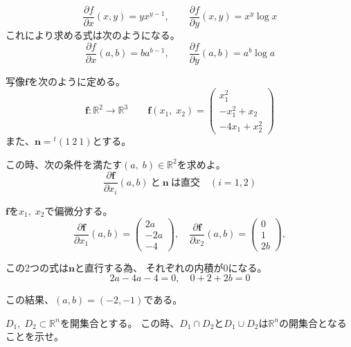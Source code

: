 \documentclass[12pt,b5paper]{ltjsarticle}
\begin{document}
\begin{equation}
 \frac{\partial f}{\partial x}(x,y) = yx^{y-1},
  \qquad
  \frac{\partial f}{\partial y}(x,y) = x^y \log x
\end{equation}
これにより求める式は次のようになる。
\begin{equation}
 \frac{\partial f}{\partial x}(a,b) = ba^{b-1},
  \qquad
  \frac{\partial f}{\partial y}(a,b) = a^b \log a
\end{equation}

\dotfill

写像$\bm{f}$を次のように定める。
\begin{equation}
 \bm{f}:\mathbb{R}^2\rightarrow\mathbb{R}^3
  \qquad \bm{f}(x_1,\;x_2)
    = \begin{pmatrix}x_1^2\\-x_1^2+x_2\\-4x_1+x_2^2\end{pmatrix}
\end{equation}
また、$\bm{n}={}^{t}\!(1\ 2\ 1)$とする。

この時、次の条件を満たす$(a,\;b)\in\mathbb{R}^2$を求めよ。
\begin{equation}
 \frac{\partial \bm{f}}{\partial x_i}(a,b)
  \ と\ \bm{n} \ は直交 \quad (i=1,2)
\end{equation}

$\bm{f}$を$x_1,\;x_2$で偏微分する。
\begin{equation}
 \frac{\partial \bm{f}}{\partial x_1}(a,b)
    = \begin{pmatrix}2a\\-2a\\-4\end{pmatrix},
 \quad
 \frac{\partial \bm{f}}{\partial x_2}(a,b)
    = \begin{pmatrix}0\\1\\2b\end{pmatrix},
\end{equation}

この2つの式は$\bm{n}$と直行する為、
それぞれの内積が0になる。
\begin{equation}
 2a-4a-4 = 0,
 \quad
 0+ 2+2b=0
\end{equation}

この結果、$(a,b)=(-2,-1)$である。

\dotfill

$D_1,\;D_2\subset \mathbb{R}^n$を開集合とする。
この時、$D_1\cap D_2$と$D_1\cup D_2$は$\mathbb{R}^n$の開集合となることを示せ。
\end{document}
